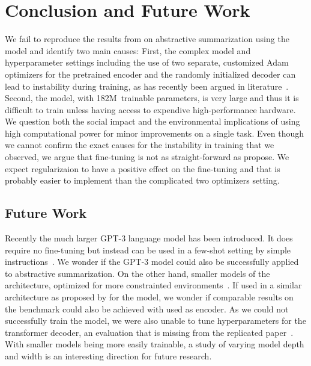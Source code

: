 \section{Conclusion and Future Work} %

We fail to reproduce the results from \citeauthor{LiuL2019} on abstractive summarization using the \BertSumAbs model and identify two main causes:
First, the complex model and hyperparameter settings including the use of two separate, customized Adam optimizers for the pretrained \Bert encoder and the randomly initialized decoder can lead to instability during training, as has recently been argued in literature~\cite{ZhangWKWA2020}. 
Second, the model, with 182M~trainable parameters, is very large and thus it is difficult to train unless having access to expendive high-performance hardware. 
We question both the social impact and the environmental implications of using high computational power for minor improvements on a single task.
Even though we cannot confirm the exact causes for the instability in training that we observed, we argue that fine-tuning \Bert is not as straight-forward as \citeauthor{LiuL2019} propose.
We expect regularizaion to have a positive effect on the fine-tuning and that is probably easier to implement than the complicated two optimizers setting.

\subsection{Future Work}

Recently the much larger GPT-3 language model has been introduced. It does require no fine-tuning but instead can be used in a few-shot setting by simple instructions~\cite{BrownMRSKDNSSAA2020}.
We wonder if the GPT-3 model could also be successfully applied to abstractive summarization.
On the other hand, smaller models of the \Bert architecture, optimized for more constrainted environments~\cite{TurcCLT2019}.
If used in a similar architecture as proposed by \citeauthor{LiuL2019} for the \BertSumAbs model, we wonder if comparable results on the \Rouge benchmark could also be achieved with \BertTiny used as encoder.
As we could not successfully train the \BertSumAbs model, we were also unable to tune hyperparameters for the transformer decoder, an evaluation that is missing from the replicated paper~\cite{LiuL2019}.
With smaller models being more easily trainable, a study of varying model depth and width is an interesting direction for future research.
